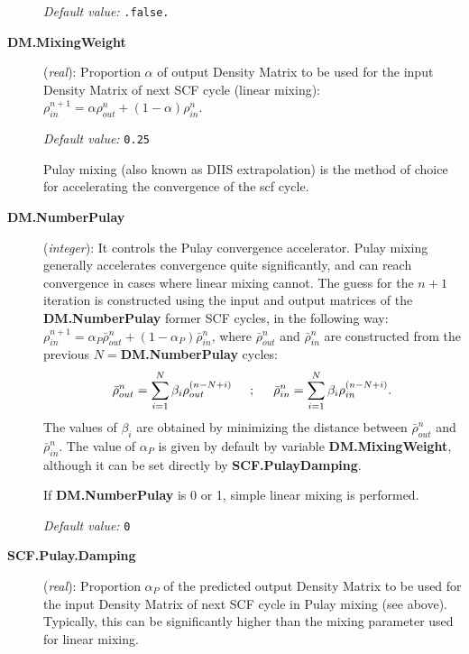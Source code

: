 \documentclass[11pt]{article}
\begin{document}
\begin{description}
{\it Default value:} {\tt .false.}


\item[{\bf DM.MixingWeight}] ({\it real}):
Proportion $\alpha$ of
output Density Matrix to be used for the input Density Matrix of
next SCF cycle (linear mixing):
$\rho^{n+1}_{in} = \alpha \rho^{n}_{out}
+(1 - \alpha) \rho^{n}_{in}$.

{\it Default value:} {\tt 0.25}


Pulay mixing (also known as DIIS extrapolation) is the method of
choice for accelerating the convergence of the scf cycle.

\item[{\bf DM.NumberPulay}] ({\it integer}):
It controls the Pulay convergence accelerator. Pulay mixing generally
accelerates convergence quite significantly, and can
reach convergence in cases where linear mixing cannot.
The guess for the $n+1$ iteration is constructed using the
input and output matrices of the {\bf DM.NumberPulay} former
SCF cycles, in the following way:
$\rho^{n+1}_{in} = \alpha_P \bar{\rho}^{n}_{out}
+(1 - \alpha_P) \bar{\rho}^{n}_{in}$, where $\bar{\rho}^{n}_{out}$
and $\bar{\rho}^{n}_{in}$ are constructed from the previous
$N=${\bf DM.NumberPulay} cycles:
%
\begin{equation}
\bar{\rho}^{n}_{out} = \sum_{i=1}^N
\beta_i \rho_{out}^{(n-N+i)} \hspace{0.5truecm}; \hspace{0.5truecm}
\bar{\rho}^{n}_{in} = \sum_{i=1}^N
\beta_i \rho_{in}^{(n-N+i)}.
\nonumber
\end{equation}
%
The values of $\beta_i$ are obtained by minimizing the distance
between $\bar{\rho}^{n}_{out}$ and $\bar{\rho}^{n}_{in}$.
The value of $\alpha_P$ is given by default by variable {\bf
  DM.MixingWeight}, although it can be set directly by {\bf
  SCF.PulayDamping}.

If {\bf DM.NumberPulay} is 0 or 1, simple linear mixing is
performed.

{\it Default value:} {\tt 0}


\item[{\bf SCF.Pulay.Damping}] ({\it real}):
Proportion $\alpha_P$ of the predicted
output Density Matrix to be used for the input Density Matrix of
next SCF cycle in Pulay mixing (see above). Typically, this can be
significantly higher than the mixing parameter used for linear
mixing. 


\end{description}
\end{document}
